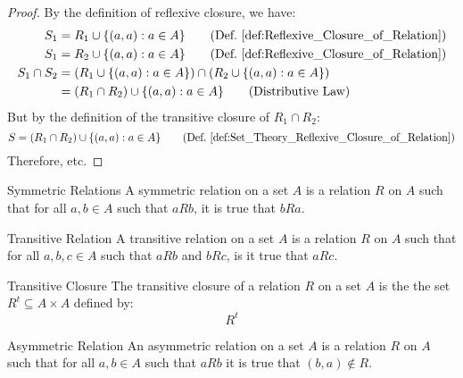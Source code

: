 \documentclass[crop=false,class=book,oneside]{standalone}                      %
\begin{document}
        \begin{proof}
            By the definition of reflexive closure, we have:
            \begin{align}
                S_{1}&=R_{1}\cup\{(a,a):a\in{A}\}
                \tag{Def.~\ref{def:Reflexive_Closure_of_Relation}}\\
                S_{1}&=R_{2}\cup\{(a,a):a\in{A}\}
                \tag{Def.~\ref{def:Reflexive_Closure_of_Relation}}\\
                \nonumber
                S_{1}\cap{S}_{2}&=
                (R_{1}\cup\{(a,a):a\in{A}\})
                \cap(R_{2}\cup\{(a,a):a\in{A}\})\\
                &=(R_{1}\cap{R}_{2})
                \cup\{(a,a):a\in{A}\}
                \tag{Distributive Law}
            \end{align}
            But by the definition of the transitive closure of
            $R_{1}\cap{R}_{2}$:
            \begin{equation}
                S=(R_{1}\cap{R}_{2})\cup\{(a,a):a\in{A}\}
                \tag{Def.~\ref{def:Set_Theory_Reflexive_%
                               Closure_of_Relation}}
            \end{equation}
            Therefore, etc.
        \end{proof}
        \begin{ldefinition}{Symmetric Relations}
            A symmetric relation on a set $A$ is a
            relation $R$ on $A$ such that for all $a,b\in{A}$
            such that $aRb$, it is true that $bRa$.
        \end{ldefinition}
        \begin{ldefinition}{Transitive Relation}
            A transitive relation on a set $A$ is a relation $R$ on $A$
            such that for all $a,b,c\in{A}$ such that $aRb$ and $bRc$,
            is it true that $aRc$.
        \end{ldefinition}
        \begin{ldefinition}{Transitive Closure}
            The transitive closure of a relation $R$ on a set
            $A$ is the the set $R^{t}\subseteq{A}\times{A}$ defined by:
            \begin{equation}
                R^{t}
            \end{equation}
        \end{ldefinition}
        \begin{ldefinition}{Asymmetric Relation}
            An asymmetric relation on a set $A$ is a relation $R$
            on $A$ such that for all $a,b\in{A}$ such that $aRb$
            it is true that $(b,a)\notin{R}$.
        \end{ldefinition}
\end{document}
